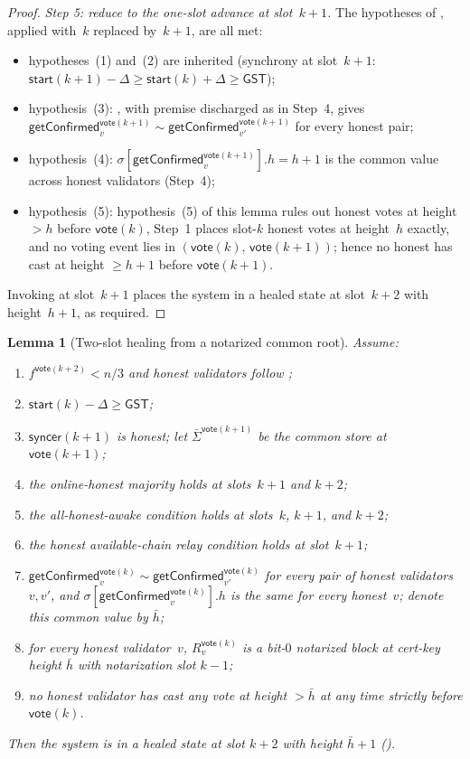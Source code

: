 \ifx\litemode\undefined\documentclass{article}\fi
\newcommand{\syncer}{\mathsf{syncer}}
\newcommand{\start}{\mathsf{start}}
\newcommand{\vote}{\mathsf{vote}}
\newcommand{\comm}[1]{\bar{#1}}
\newcommand{\getConfirmed}{\textsf{getConfirmed}\xspace}
\theoremstyle{plain}
\newtheorem{lemma}{Lemma}
\theoremstyle{definition}
\theoremstyle{remark}
\newcommand{\GST}{\ensuremath{\mathsf{GST}}}
\newcommand{\OHM}{online-honest majority\xspace}
\newcommand{\HAR}{honest available-chain relay\xspace}
\newcommand{\AHA}{all-honest-awake\xspace}
\begin{document}
\begin{proof}
\emph{Step 5: reduce to the one-slot advance at slot~$k+1$.}
The hypotheses of , applied with~$k$ replaced by~$k+1$, are all met:
\begin{itemize}
  \item hypotheses~(1) and~(2) are inherited (synchrony at slot~$k+1$: $\start(k+1) - \Delta \geq \start(k) + \Delta \geq \GST$);
  \item hypothesis~(3): , with premise discharged as in Step~4, gives $\getConfirmed_v^{\vote(k+1)} \sim \getConfirmed_{v'}^{\vote(k+1)}$ for every honest pair;
  \item hypothesis~(4): $\sigma[\getConfirmed_v^{\vote(k+1)}].h = h + 1$ is the common value across honest validators (Step~4);
  \item hypothesis~(5): hypothesis~(5) of this lemma rules out honest votes at height $>h$ before $\vote(k)$, Step~1 places slot-$k$ honest votes at height~$h$ exactly, and no voting event lies in $(\vote(k),\, \vote(k+1))$; hence no honest has cast at height $\geq h+1$ before $\vote(k+1)$.
\end{itemize}
Invoking  at slot~$k+1$ places the system in a healed state at slot~$k+2$ with height~$h+1$, as required.
\end{proof}

\begin{lemma}[Two-slot healing from a notarized common root]\label{rev:lem:healing-from-notarized}
Assume:
\begin{enumerate}
  \item $f^{\vote(k+2)} < n/3$ and honest validators follow ;
  \item $\start(k) - \Delta \geq \GST$;
  \item $\syncer(k+1)$ is honest; let $\comm{\Sigma}^{\vote(k+1)}$ be the common store at $\vote(k+1)$;
  \item the \OHM holds at slots~$k+1$ and $k+2$;
  \item the \AHA condition holds at slots~$k$, $k+1$, and $k+2$;
  \item the \HAR condition holds at slot~$k+1$;
  \item $\getConfirmed_v^{\vote(k)} \sim \getConfirmed_{v'}^{\vote(k)}$ for every pair of honest validators~$v, v'$, and $\sigma[\getConfirmed_v^{\vote(k)}].h$ is the same for every honest~$v$; denote this common value by $\comm{h}$;
  \item for every honest validator~$v$, $R_v^{\vote(k)}$ is a bit-$0$ notarized block at cert-key height $\comm{h}$ with notarization slot $k-1$;
  \item no honest validator has cast any vote at height $> \comm{h}$ at any time strictly before $\vote(k)$.
\end{enumerate}
Then the system is in a healed state at slot $k+2$ with height $\comm{h}+1$ ().
\end{lemma}
\end{document}

